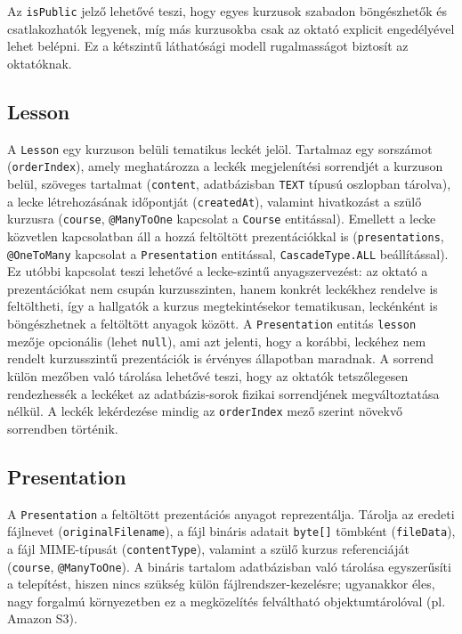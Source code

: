 Az \texttt{isPublic} jelző lehetővé teszi, hogy egyes kurzusok szabadon böngészhetők és csatlakozhatók legyenek, míg más kurzusokba csak az oktató explicit engedélyével lehet belépni. Ez a kétszintű láthatósági modell rugalmasságot biztosít az oktatóknak.

\subsection{Lesson}

A \texttt{Lesson} egy kurzuson belüli tematikus leckét jelöl. Tartalmaz egy sorszámot (\texttt{orderIndex}), amely meghatározza a leckék megjelenítési sorrendjét a kurzuson belül, szöveges tartalmat (\texttt{content}, adatbázisban \texttt{TEXT} típusú oszlopban tárolva), a lecke létrehozásának időpontját (\texttt{createdAt}), valamint hivatkozást a szülő kurzusra (\texttt{course}, \texttt{@ManyToOne} kapcsolat a \texttt{Course} entitással). Emellett a lecke közvetlen kapcsolatban áll a hozzá feltöltött prezentációkkal is (\texttt{presentations}, \texttt{@OneToMany} kapcsolat a \texttt{Presentation} entitással, \texttt{CascadeType.ALL} beállítással).
Ez utóbbi kapcsolat teszi lehetővé a lecke-szintű anyagszervezést: az oktató a prezentációkat nem csupán kurzusszinten, hanem konkrét leckékhez rendelve is feltöltheti, így a hallgatók a kurzus megtekintésekor tematikusan, leckénként is böngészhetnek a feltöltött anyagok között. A \texttt{Presentation} entitás \texttt{lesson} mezője opcionális (lehet \texttt{null}), ami azt jelenti, hogy a korábbi, leckéhez nem rendelt kurzusszintű prezentációk is érvényes állapotban maradnak.
A sorrend külön mezőben való tárolása lehetővé teszi, hogy az oktatók tetszőlegesen rendezhessék a leckéket az adatbázis-sorok fizikai sorrendjének megváltoztatása nélkül. A leckék lekérdezése mindig az \texttt{orderIndex} mező szerint növekvő sorrendben történik.

\subsection{Presentation}

A \texttt{Presentation} a feltöltött prezentációs anyagot reprezentálja. Tárolja az eredeti fájlnevet (\texttt{originalFilename}), a fájl bináris adatait \texttt{byte[]} tömbként (\texttt{fileData}), a fájl MIME-típusát (\texttt{contentType}), valamint a szülő kurzus referenciáját (\texttt{course}, \texttt{@ManyToOne}). A bináris tartalom adatbázisban való tárolása egyszerűsíti a telepítést, hiszen nincs szükség külön fájlrendszer-kezelésre; ugyanakkor éles, nagy forgalmú környezetben ez a megközelítés felváltható objektumtárolóval (pl. Amazon S3).

